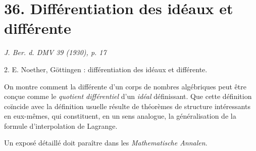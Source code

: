 \section*{36. Différentiation des idéaux et différente}

\begin{center}
\emph{J. Ber. d. DMV 39 (1930), p. 17}
\end{center}

2. E. Noether, Göttingen : différentiation des idéaux et différente.

On montre comment la différente d'un corps de nombres algébriques peut être conçue comme le \emph{quotient différentiel} d'un \emph{idéal} définissant. Que cette définition coïncide avec la définition usuelle résulte de théorèmes de structure intéressants en eux-mêmes, qui constituent, en un sens analogue, la généralisation de la formule d'interpolation de Lagrange.

Un exposé détaillé doit paraître dans les \emph{Mathematische Annalen}.

\setcounter{footnote}{0}
\clearpage
